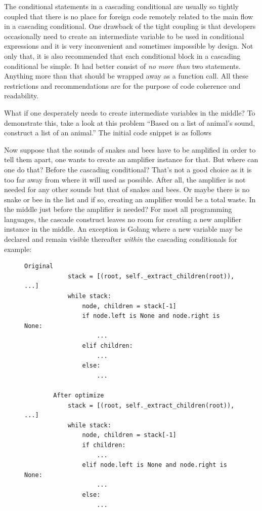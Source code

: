 The conditional statements in a cascading conditional are usually so tightly coupled that
there is no place for foreign code remotely related to the main flow in a cascading conditional.
One drawback of the tight coupling is that developers occasionally need to create an intermediate
variable to be used in conditional expressions and
it is very inconvenient and sometimes impossible by design.
Not only that, it is also recommended that each conditional block in a cascading conditional be
simple.
It had better consist of \emph{no more than} two statements.
Anything more than that should be wrapped away as a function call.
All these restrictions and recommendations are for the purpose of code coherence and readability.

What if one desperately needs to create intermediate variables in the middle?
To demonstrate this, take a look at this problem ``Based on a list of animal's sound,
construct a list of an animal.''
The initial code snippet is as follows

Now suppose that the sounds of snakes and bees have to be amplified in order to tell them apart,
one wants to create an amplifier instance for that.
But where can one do that?
Before the cascading conditional?
That's not a good choice as it is too far away from where it will used as possible.
After all, the amplifier is not needed for any other sounds but that of snakes and bees.
Or maybe there is no snake or bee in the list and if so, creating an amplifier would be a total
waste.
In the middle just before the amplifier is needed?
For most all programming languages, the
cascade construct leaves no room for creating a new amplifier instance in the middle.
An exception is Golang where a new variable may be declared and remain visible
thereafter \emph{within} the cascading conditionals for example:


\begin{figure}[h]
  \centering
  \begin{lstlisting}[caption={This example demonstrate organizing cascading if statements the right way.}]
        Original
            stack = [(root, self._extract_children(root)), ...]
            while stack:
                node, children = stack[-1]
                if node.left is None and node.right is None:
                    ...
                elif children:
                    ...
                else:
                    ...

        After optimize
            stack = [(root, self._extract_children(root)), ...]
            while stack:
                node, children = stack[-1]
                if children:
                    ...
                elif node.left is None and node.right is None:
                    ...
                else:
                    ...
    \end{lstlisting}
\end{figure}

